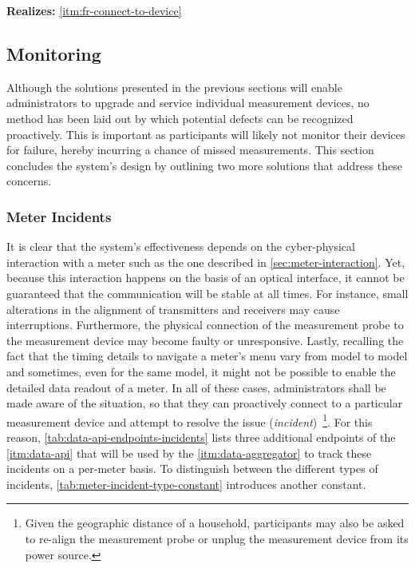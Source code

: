 \textbf{Realizes:} \ref{itm:fr-connect-to-device}


\subsection{Monitoring}
\label{sec:monitoring}

Although the solutions presented in the previous sections will enable administrators to upgrade and service individual measurement devices, no method has been laid out by which potential defects can be recognized proactively. This is important as participants will likely not monitor their devices for failure, hereby incurring a chance of missed measurements. This section concludes the system's design by outlining two more solutions that address these concerns.


\subsubsection{Meter Incidents}
\label{sec:meter-incidents}

It is clear that the system's effectiveness depends on the cyber-physical interaction with a meter such as the one described in \autoref{sec:meter-interaction}. Yet, because this interaction happens on the basis of an optical interface, it cannot be guaranteed that the communication will be stable at all times. For instance, small alterations in the alignment of transmitters and receivers may cause interruptions. Furthermore, the physical connection of the measurement probe to the measurement device may become faulty or unresponsive. Lastly, recalling the fact that the timing details to navigate a meter's menu vary from model to model and sometimes, even for the same model, it might not be possible to enable the detailed data readout of a meter. In all of these cases, administrators shall be made aware of the situation, so that they can proactively connect to a particular measurement device and attempt to resolve the issue (\textit{incident})~\footnote{Given the geographic distance of a household, participants may also be asked to re-align the measurement probe or unplug the measurement device from its power source.}. For this reason, \autoref{tab:data-api-endpoints-incidents} lists three additional endpoints of the \ref{itm:data-api} that will be used by the \ref{itm:data-aggregator} to track these incidents on a per-meter basis. To distinguish between the different types of incidents, \autoref{tab:meter-incident-type-constant} introduces another constant.

